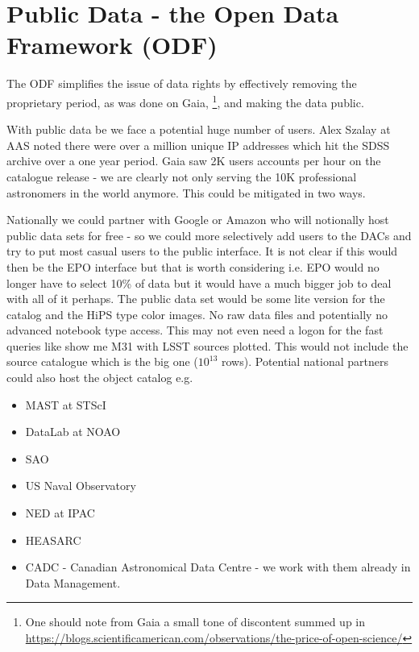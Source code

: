 

\section{Public Data - the Open Data Framework (ODF)}\label{sec:public}

The ODF simplifies the issue of data rights by effectively removing the proprietary period, as was done on Gaia,
\footnote{One should note from Gaia a small tone of discontent summed up in \url{https://blogs.scientificamerican.com/observations/the-price-of-open-science/}},
and making the data public.

With public data be we face a potential huge number of users.
Alex Szalay at AAS noted there were over a million unique IP addresses which hit the SDSS archive over a one year period.  Gaia saw 2K users accounts per hour on the catalogue release - we are clearly not only serving the 10K professional astronomers in the world anymore.
This could be mitigated in two ways.


Nationally we could partner with Google or Amazon who will notionally host public data sets for free - so we could more selectively add users to the DACs and try to put most casual users to the public interface. It is not clear if this would then be the EPO interface but that is worth considering i.e. EPO would no longer have to select 10\% of data but it would have a much bigger job to deal with all of it perhaps.
The public data set would be some lite version for the catalog   and the HiPS type color images. No raw data files and potentially no advanced notebook type access. This may not even need a logon for the fast queries like show me M31 with LSST sources plotted. This would not include the source catalogue which is the big one ($10^{13}$ rows).
Potential national partners  could also host the object catalog e.g.

\begin{itemize}
 \item MAST at STScI
 \item DataLab at NOAO
 \item SAO
 \item US Naval Observatory
 \item NED at IPAC
 \item HEASARC
 \item CADC - Canadian Astronomical Data Centre - we work with them already in Data Management.
\end{itemize}

